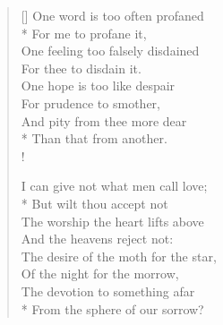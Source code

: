 \documentclass[MAIN]{subfiles}
\begin{document}
\settowidth{\versewidth}{One feeling too falsely disdained}
\begin{verse}[\versewidth]
One word is too often profaned\\*
\vin For me to profane it,\\
One feeling too falsely disdained\\
\vin For thee to disdain it.\\
One hope is too like despair\\
\vin For prudence to smother,\\
And pity from thee more dear\\*
\vin Than that from another.\\!

I can give not what men call love;\\*
\vin But wilt thou accept not\\
The worship the heart lifts above\\
\vin And the heavens reject not:\\
The desire of the moth for the star,\\
\vin Of the night for the morrow,\\
The devotion to something afar\\*
\vin From the sphere of our sorrow?
\end{verse}
\end{document}
